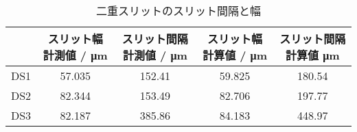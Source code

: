 \begin{table}[!htp]\centering
    \caption{二重スリットのスリット間隔と幅}\label{tab:ds_slit_width}
    \scriptsize
    \begin{tabular}{ccccc}\toprule
            & スリット幅 計測値 / \si{\micro\meter} & スリット間隔 計測値 / \si{\micro\meter} & スリット幅 計算値 / \si{\micro\meter} & スリット間隔 計算値 \si{\micro\meter} \\\midrule
        DS1 & 57.035                        & 152.41                         & 59.825                        & 180.54                       \\
        DS2 & 82.344                        & 153.49                         & 82.706                        & 197.77                       \\
        DS3 & 82.187                        & 385.86                         & 84.183                        & 448.97                       \\
        \bottomrule
    \end{tabular}
\end{table}
